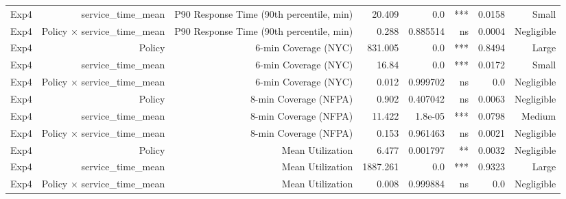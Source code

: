 \begin{table}[htbp]
\begin{tabular}{lrrrrrrr}
Exp4 & service_time_mean & P90 Response Time (90th percentile, min) & 20.409 & 0.0 & *** & 0.0158 & Small \\
Exp4 & Policy × service_time_mean & P90 Response Time (90th percentile, min) & 0.288 & 0.885514 & ns & 0.0004 & Negligible \\
Exp4 & Policy & 6-min Coverage (NYC) & 831.005 & 0.0 & *** & 0.8494 & Large \\
Exp4 & service_time_mean & 6-min Coverage (NYC) & 16.84 & 0.0 & *** & 0.0172 & Small \\
Exp4 & Policy × service_time_mean & 6-min Coverage (NYC) & 0.012 & 0.999702 & ns & 0.0 & Negligible \\
Exp4 & Policy & 8-min Coverage (NFPA) & 0.902 & 0.407042 & ns & 0.0063 & Negligible \\
Exp4 & service_time_mean & 8-min Coverage (NFPA) & 11.422 & 1.8e-05 & *** & 0.0798 & Medium \\
Exp4 & Policy × service_time_mean & 8-min Coverage (NFPA) & 0.153 & 0.961463 & ns & 0.0021 & Negligible \\
Exp4 & Policy & Mean Utilization & 6.477 & 0.001797 & ** & 0.0032 & Negligible \\
Exp4 & service_time_mean & Mean Utilization & 1887.261 & 0.0 & *** & 0.9323 & Large \\
Exp4 & Policy × service_time_mean & Mean Utilization & 0.008 & 0.999884 & ns & 0.0 & Negligible \\
\bottomrule
\end{tabular}
\end{table}